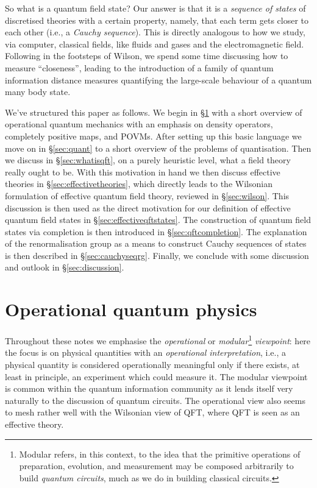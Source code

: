 \documentclass[11pt]{amsart}
\theoremstyle{plain}%
\theoremstyle{definition}
\theoremstyle{remark}
\begin{document}
So what is a quantum field state? Our answer is that it is a \emph{sequence of states} of discretised theories with a certain property, namely, that each term gets closer to each other (i.e., a \emph{Cauchy sequence}). This is directly analogous to how we study, via computer, classical fields, like fluids and gases and the electromagnetic field. Following in the footsteps of Wilson, we spend some time discussing how to measure ``closeness'', leading to the introduction of a family of quantum information distance measures quantifying the large-scale behaviour of a quantum many body state. 

We've structured this paper as follows. We begin in \S\ref{sec:opqp} with a short overview of operational quantum mechanics with an emphasis on density operators, completely positive maps, and POVMs. After setting up this basic language we move on in \S\ref{sec:quant} to a short overview of the problems of quantisation. Then we discuss in \S\ref{sec:whatisqft}, on a purely heuristic level, what a field theory really ought to be. With this motivation in hand we then discuss effective theories in \S\ref{sec:effectivetheories}, which directly leads to the Wilsonian formulation of effective quantum field theory, reviewed in \S\ref{sec:wilson}. This discussion is then used as the direct motivation for our definition of effective quantum field states in \S\ref{sec:effectiveqftstates}. The construction of quantum field states via completion is then introduced in \S\ref{sec:qftcompletion}. The explanation of the renormalisation group as a means to construct Cauchy sequences of states is then described in \S\ref{sec:cauchyseqrg}. Finally, we conclude with some discussion and outlook in \S\ref{sec:discussion}.

\section{Operational quantum physics}\label{sec:opqp}
Throughout these notes we emphasise the \emph{operational} or \emph{modular}\footnote{Modular refers, in this context, to the idea that the primitive operations of preparation, evolution, and measurement may be composed arbitrarily to build \emph{quantum circuits}, much as we do in building classical circuits.} \emph{viewpoint}: here the focus is on physical quantities with an \emph{operational interpretation}, i.e., a physical quantity is considered operationally meaningful only if there exists, at least in principle, an experiment which could measure it. The modular viewpoint is common within the quantum information community as it lends itself very naturally to the discussion of quantum circuits. The operational view also seems to mesh rather well with the Wilsonian view of QFT, where QFT is seen as an effective theory.
\end{document}
